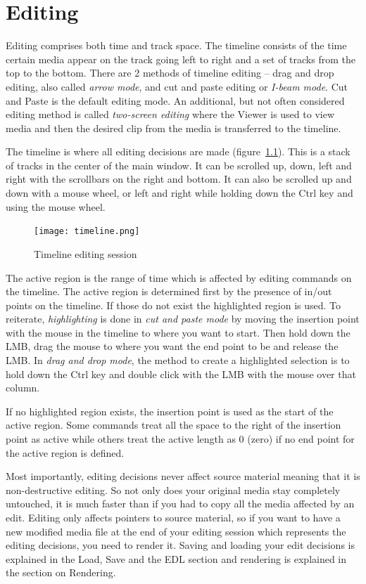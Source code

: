 \chapter{Editing}%
\label{cha:editing}

Editing comprises both time and track space.  The timeline consists
of the time certain media appear on the track going left to right
and a set of tracks from the top to the bottom.  There are 2 methods
of timeline editing -- drag and drop editing, also called
\textit{arrow mode}, and cut and paste editing or \textit{I-beam
  mode}.  Cut and Paste is the default editing mode.  An additional,
but not often considered editing method is called \textit{two-screen
  editing} where the Viewer is used to view media and then the
desired clip from the media is transferred to the timeline.

The timeline is where all editing decisions are made
(figure~\ref{fig:timeline}).  This is a stack of tracks in the
center of the main window.  It can be scrolled up, down, left and
right with the scrollbars on the right and bottom.  It can also be
scrolled up and down with a mouse wheel, or left and right while
holding down the Ctrl key and using the mouse wheel.

\begin{figure}[htpb]
  \centering
  \texttt{[image: timeline.png]}
  \caption{Timeline editing session}
  \label{fig:timeline}
\end{figure}

The active region is the range of time which is affected by editing
commands on the timeline.  The active region is determined first by
the presence of in/out points on the timeline.
%
If those do not exist the highlighted region is used. To reiterate,
\emph{highlighting} is done in \emph{cut and paste mode} by moving
the insertion point with the mouse in the timeline to where you want
to start. Then hold down the LMB\@, drag the mouse to where you want
the end point to be and release the LMB\@. In \emph{drag and drop
  mode}, the method to create a highlighted selection is to hold
down the Ctrl key and double click with the LMB with the mouse over
that column.

If no highlighted region exists, the insertion point is used as the
start of the active region.  Some commands treat all the space to
the right of the insertion point as active while others treat the
active length as 0 (zero) if no end point for the active region is
defined.

Most importantly, editing decisions never affect source material
meaning that it is non-destructive editing.  So not only does your
original media stay completely untouched, it is much faster than if
you had to copy all the media affected by an edit.  Editing only
affects pointers to source material, so if you want to have a new
modified media file at the end of your editing session which
represents the editing decisions, you need to render it.  Saving and
loading your edit decisions is explained in the Load, Save and the
EDL section and rendering is explained in the section on Rendering.

